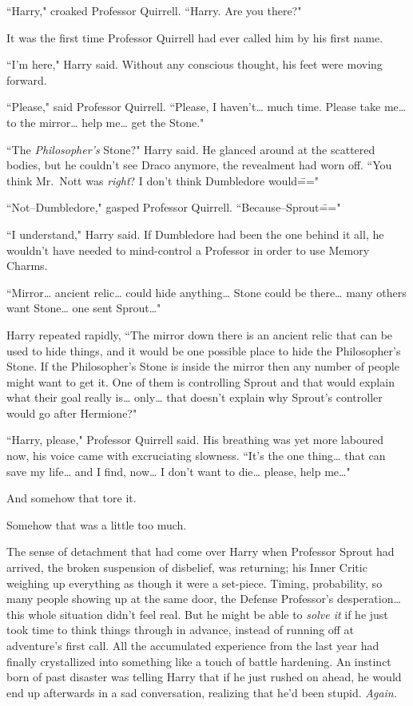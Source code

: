 ``Harry," croaked Professor Quirrell. ``Harry. Are you there?"

It was the first time Professor Quirrell had ever called him by his first name.

``I'm here," Harry said. Without any conscious thought, his feet were moving forward.

``Please," said Professor Quirrell. ``Please, I haven't{\ldots} much time. Please take me{\ldots} to the mirror{\ldots} help me{\ldots} get the Stone."

``The \emph{Philosopher's} Stone?" Harry said. He glanced around at the scattered bodies, but he couldn't see Draco anymore, the revealment had worn off. ``You think Mr.~Nott was \emph{right}? I don't think Dumbledore would\==="

``Not\---Dumbledore," gasped Professor Quirrell. ``Because\---Sprout\==="

``I understand," Harry said. If Dumbledore had been the one behind it all, he wouldn't have needed to mind-control a Professor in order to use Memory Charms.

``Mirror{\ldots} ancient relic{\ldots} could hide anything{\ldots} Stone could be there{\ldots} many others want Stone{\ldots} one sent Sprout{\ldots}"

Harry repeated rapidly, ``The mirror down there is an ancient relic that can be used to hide things, and it would be one possible place to hide the Philosopher's Stone. If the Philosopher's Stone is inside the mirror then any number of people might want to get it. One of them is controlling Sprout and that would explain what their goal really is{\ldots} only{\ldots} that doesn't explain why Sprout's controller would go after Hermione?"

``Harry, please," Professor Quirrell said. His breathing was yet more laboured now, his voice came with excruciating slowness. ``It's the one thing{\ldots} that can save my life{\ldots} and I find, now{\ldots} I don't want to die{\ldots} please, help me{\ldots}"

And somehow that tore it.

Somehow that was a little too much.

The sense of detachment that had come over Harry when Professor Sprout had arrived, the broken suspension of disbelief, was returning; his Inner Critic weighing up everything as though it were a set-piece. Timing, probability, so many people showing up at the same door, the Defense Professor's desperation{\ldots} this whole situation didn't feel real. But he might be able to \emph{solve it} if he just took time to think things through in advance, instead of running off at adventure's first call. All the accumulated experience from the last year had finally crystallized into something like a touch of battle hardening. An instinct born of past disaster was telling Harry that if he just rushed on ahead, he would end up afterwards in a sad conversation, realizing that he'd been stupid. \emph{Again.}

